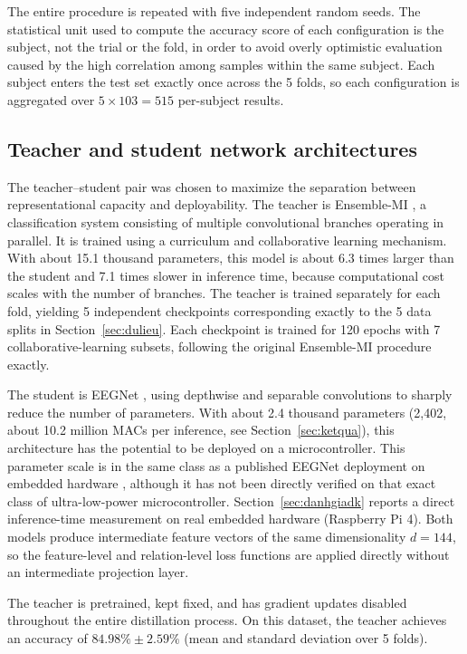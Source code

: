 The entire procedure is repeated with five independent random seeds.
The statistical unit used to compute the accuracy score of each
configuration is the subject, not the trial or the fold, in order to
avoid overly optimistic evaluation caused by the high correlation
among samples within the same subject. Each subject enters the test
set exactly once across the 5 folds, so each configuration is
aggregated over $5 \times 103 = 515$ per-subject results.

\subsection{Teacher and student network architectures}
\label{sec:kientruc}

The teacher--student pair was chosen to maximize the separation
between representational capacity and deployability. The teacher is
Ensemble-MI \cite{zoumpourlis2024motor}, a classification system
consisting of multiple convolutional branches operating in parallel.
It is trained using a curriculum and collaborative learning
mechanism. With about 15.1 thousand parameters, this model is about
6.3 times larger than the student and 7.1 times slower in inference
time, because computational cost scales with the number of branches.
The teacher is trained separately for each fold, yielding 5
independent checkpoints corresponding exactly to the 5 data splits
in Section~\ref{sec:dulieu}. Each checkpoint is trained for 120
epochs with 7 collaborative-learning subsets, following the original
Ensemble-MI procedure exactly.

The student is EEGNet \cite{lawhern2018eegnet}, using depthwise and
separable convolutions to sharply reduce the number of parameters.
With about 2.4 thousand parameters (2,402, about 10.2 million MACs
per inference, see Section~\ref{sec:ketqua}), this architecture has
the potential to be deployed on a microcontroller. This parameter
scale is in the same class as a published EEGNet deployment on
embedded hardware \cite{wang2024mibminet}, although it has not been
directly verified on that exact class of ultra-low-power
microcontroller. Section~\ref{sec:danhgiadk} reports a direct
inference-time measurement on real embedded hardware (Raspberry Pi
4). Both models produce intermediate feature vectors of the same
dimensionality $d = 144$, so the feature-level and relation-level
loss functions are applied directly without an intermediate
projection layer.

The teacher is pretrained, kept fixed, and has gradient updates
disabled throughout the entire distillation process. On this
dataset, the teacher achieves an accuracy of $84.98\% \pm 2.59\%$
(mean and standard deviation over 5 folds).

